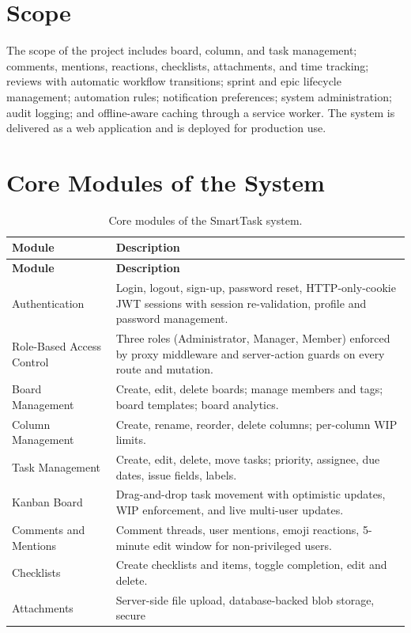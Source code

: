 \documentclass[12pt,a4paper]{report}
\begin{document}
\section{Scope}
The scope of the project includes board, column, and task management; comments,
mentions, reactions, checklists, attachments, and time tracking; reviews with
automatic workflow transitions; sprint and epic lifecycle management; automation
rules; notification preferences; system administration; audit logging; and
offline-aware caching through a service worker. The system is delivered as a web
application and is deployed for production use.

\section{Core Modules of the System}
\begin{longtable}{|p{4.5cm}|p{11.5cm}|}
\caption{Core modules of the SmartTask system.}\\
\hline
\textbf{Module} & \textbf{Description} \\
\hline
\endfirsthead
\hline
\textbf{Module} & \textbf{Description} \\
\hline
\endhead
\hline
\endlastfoot
Authentication & Login, logout, sign-up, password reset, HTTP-only-cookie JWT
sessions with session re-validation, profile and password management. \\
\hline
Role-Based Access Control & Three roles (Administrator, Manager, Member) enforced
by proxy middleware and server-action guards on every route and mutation. \\
\hline
Board Management & Create, edit, delete boards; manage members and tags; board
templates; board analytics. \\
\hline
Column Management & Create, rename, reorder, delete columns; per-column WIP
limits. \\
\hline
Task Management & Create, edit, delete, move tasks; priority, assignee, due
dates, issue fields, labels. \\
\hline
Kanban Board & Drag-and-drop task movement with optimistic updates, WIP
enforcement, and live multi-user updates. \\
\hline
Comments and Mentions & Comment threads, user mentions, emoji reactions,
5-minute edit window for non-privileged users. \\
\hline
Checklists & Create checklists and items, toggle completion, edit and delete. \\
\hline
Attachments & Server-side file upload, database-backed blob storage, secure

\end{longtable}
\end{document}
